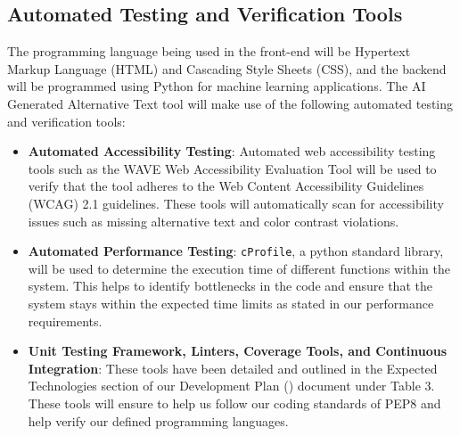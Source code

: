 \documentclass[12pt, titlepage]{article}
\begin{document}
\subsection{Automated Testing and Verification Tools}
The programming language being used in the front-end will be Hypertext Markup Language (HTML) and 
Cascading Style Sheets (CSS), and 
the backend will be programmed using Python for machine learning applications.
The AI Generated Alternative Text tool will make use of the following
automated testing and verification tools:
\begin{itemize}
  \item \textbf{Automated Accessibility Testing}: Automated web
    accessibility testing tools such as the WAVE Web Accessibility
    Evaluation Tool will be used to
    verify that the tool adheres to the Web Content Accessibility
    Guidelines (WCAG) 2.1 guidelines. These tools will automatically
    scan for accessibility issues such as missing alternative text
    and color contrast violations.
  \item \textbf{Automated Performance Testing}: \texttt{cProfile}, a python standard library, will be 
  used to determine the execution time of different functions within the system. This helps to identify 
  bottlenecks in the code and ensure that the system stays within the expected time limits as stated in our 
  performance requirements.
  \item \textbf{Unit Testing Framework, Linters, Coverage Tools, and
    Continuous Integration}: These tools have been detailed and
    outlined in the Expected Technologies section
    of our Development Plan (\citet{DP}) document under Table 3. These tools
    will ensure to help us follow our coding standards of PEP8 and help verify 
    our defined programming languages.
\end{itemize}
\end{document}
